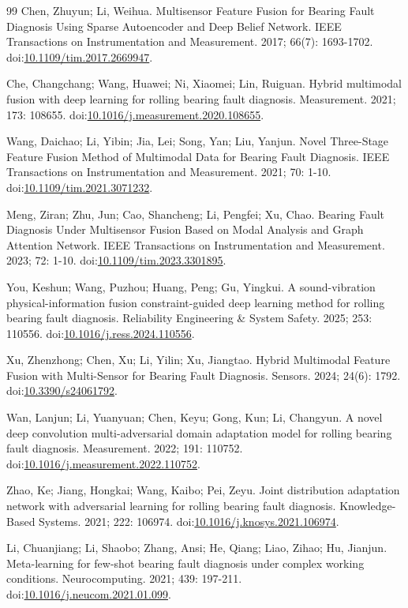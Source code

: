 \documentclass[11pt]{article}
\begin{document}
\begin{thebibliography}{99}
 Chen, Zhuyun; Li, Weihua. Multisensor Feature Fusion for Bearing Fault Diagnosis Using Sparse Autoencoder and Deep Belief Network. IEEE Transactions on Instrumentation and Measurement. 2017; 66(7): 1693-1702. doi:\url{10.1109/tim.2017.2669947}.

 Che, Changchang; Wang, Huawei; Ni, Xiaomei; Lin, Ruiguan. Hybrid multimodal fusion with deep learning for rolling bearing fault diagnosis. Measurement. 2021; 173: 108655. doi:\url{10.1016/j.measurement.2020.108655}.

 Wang, Daichao; Li, Yibin; Jia, Lei; Song, Yan; Liu, Yanjun. Novel Three-Stage Feature Fusion Method of Multimodal Data for Bearing Fault Diagnosis. IEEE Transactions on Instrumentation and Measurement. 2021; 70: 1-10. doi:\url{10.1109/tim.2021.3071232}.

 Meng, Ziran; Zhu, Jun; Cao, Shancheng; Li, Pengfei; Xu, Chao. Bearing Fault Diagnosis Under Multisensor Fusion Based on Modal Analysis and Graph Attention Network. IEEE Transactions on Instrumentation and Measurement. 2023; 72: 1-10. doi:\url{10.1109/tim.2023.3301895}.

 You, Keshun; Wang, Puzhou; Huang, Peng; Gu, Yingkui. A sound-vibration physical-information fusion constraint-guided deep learning method for rolling bearing fault diagnosis. Reliability Engineering \& System Safety. 2025; 253: 110556. doi:\url{10.1016/j.ress.2024.110556}.

 Xu, Zhenzhong; Chen, Xu; Li, Yilin; Xu, Jiangtao. Hybrid Multimodal Feature Fusion with Multi-Sensor for Bearing Fault Diagnosis. Sensors. 2024; 24(6): 1792. doi:\url{10.3390/s24061792}.

 Wan, Lanjun; Li, Yuanyuan; Chen, Keyu; Gong, Kun; Li, Changyun. A novel deep convolution multi-adversarial domain adaptation model for rolling bearing fault diagnosis. Measurement. 2022; 191: 110752. doi:\url{10.1016/j.measurement.2022.110752}.

 Zhao, Ke; Jiang, Hongkai; Wang, Kaibo; Pei, Zeyu. Joint distribution adaptation network with adversarial learning for rolling bearing fault diagnosis. Knowledge-Based Systems. 2021; 222: 106974. doi:\url{10.1016/j.knosys.2021.106974}.

 Li, Chuanjiang; Li, Shaobo; Zhang, Ansi; He, Qiang; Liao, Zihao; Hu, Jianjun. Meta-learning for few-shot bearing fault diagnosis under complex working conditions. Neurocomputing. 2021; 439: 197-211. doi:\url{10.1016/j.neucom.2021.01.099}.


\end{thebibliography}
\end{document}
